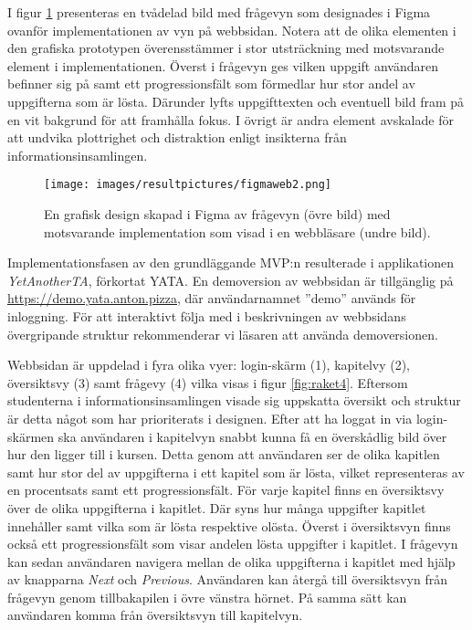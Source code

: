 I figur \ref{fig:raket2} presenteras en tvådelad bild med frågevyn som designades i Figma ovanför implementationen av vyn på webbsidan. Notera att de olika elementen i den grafiska prototypen överensstämmer i stor utsträckning med motsvarande element i implementationen. Överst i frågevyn ges vilken uppgift användaren befinner sig på samt ett progressionsfält som förmedlar hur stor andel av uppgifterna som är lösta. Därunder lyfts uppgifttexten och eventuell bild fram på en vit bakgrund för att framhålla fokus. I övrigt är andra element avskalade för att undvika plottrighet och distraktion enligt insikterna från informationsinsamlingen. 

\begin{figure}[hbtp]
    \centering
    \texttt{[image: images/resultpictures/figmaweb2.png]}
    \caption{En grafisk design skapad i Figma av frågevyn (övre bild) med motsvarande implementation som visad i en webbläsare (undre bild).}
    \label{fig:raket2}
\end{figure}

Implementationsfasen av den grundläggande MVP:n resulterade i applikationen \emph{YetAnotherTA}, förkortat YATA. En demoversion av webbsidan är tillgänglig på \url{https://demo.yata.anton.pizza}, där användarnamnet ''demo'' används för inloggning. För att interaktivt följa med i beskrivningen av webbsidans övergripande struktur rekommenderar vi läsaren att använda demoversionen. 

Webbsidan är uppdelad i fyra olika vyer: login-skärm (1), kapitelvy (2), översiktsvy (3) samt frågevy (4) vilka visas i figur \ref{fig:raket4}. Eftersom studenterna i informationsinsamlingen visade sig uppskatta översikt och struktur är detta något som har prioriterats i designen. Efter att ha loggat in via login-skärmen ska användaren i kapitelvyn snabbt kunna få en överskådlig bild över hur den ligger till i kursen. Detta genom att användaren ser de olika kapitlen samt hur stor del av uppgifterna i ett kapitel som är lösta, vilket representeras av en procentsats samt ett progressionsfält. För varje kapitel finns en översiktsvy över de olika uppgifterna i kapitlet. Där syns hur många uppgifter kapitlet innehåller samt vilka som är lösta respektive olösta. Överst i översiktsvyn finns också ett progressionsfält som visar andelen lösta uppgifter i kapitlet. I frågevyn kan sedan användaren navigera mellan de olika uppgifterna i kapitlet med hjälp av knapparna \emph{Next} och \emph{Previous}. Användaren kan återgå till översiktsvyn från frågevyn genom tillbakapilen i övre vänstra hörnet. På samma sätt kan användaren komma från översiktsvyn till kapitelvyn. 

